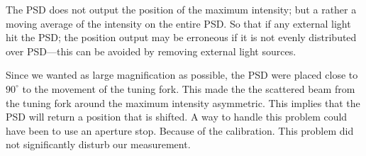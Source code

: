 The PSD does not output the position of the maximum intensity; but a rather a moving average of the intensity on the entire PSD. 
So that if any external light hit the PSD; the position output may be erroneous if it is not evenly 
distributed over PSD---this can be avoided by removing external light sources.

Since we wanted as large magnification as possible, the PSD were placed close to $90^\circ$
to the movement of the tuning fork. This made the the scattered beam from the tuning fork around the maximum intensity asymmetric. This implies that the PSD will return a position that is shifted.
A way to handle this problem could have been to use an aperture stop. 
Because of the calibration. This problem did not significantly disturb our measurement.